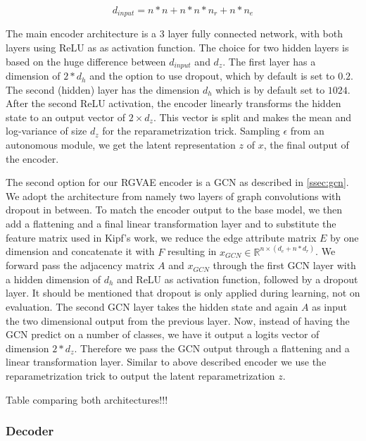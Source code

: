 \begin{equation}
\label{eq4:inputdim}
    d_{input} = n*n + n*n*n_r + n*n_e
\end{equation}

The main encoder architecture is a 3 layer fully connected network, with both layers using ReLU as as activation function. The choice for two hidden layers is based on the huge difference between $d_{input}$ and $d_z$. The first layer has a dimension of $2*d_h$ and the option to use dropout, which by default is set to $0.2$. The second (hidden) layer has the dimension $d_h$ which is by default set to $1024$. After the second ReLU activation, the encoder linearly transforms the hidden state to an output vector of $2 \times d_z$. This vector is split and makes the mean and log-variance of size $d_z$ for the reparametrization trick. Sampling $\epsilon$ from an autonomous module, we get the latent representation $z$ of $x$,  the final output of the encoder.

The second option for our RGVAE encoder is a GCN as described in \ref{ssec:gcn}. We adopt the architecture from \cite{kipf_semi-supervised_2017} namely two layers of graph convolutions with dropout in between. To match the encoder output to the base model, we then add a flattening and a final linear transformation layer and to substitute the feature matrix used in Kipf's work, we reduce the edge attribute matrix $E$ by one dimension and concatenate it with $F$ resulting in $x_{GCN} \in \mathbb{R}^{n \times (d_e+n*d_r)}$. We forward pass the adjacency matrix $A$ and $x_{GCN}$ through the first GCN layer with a hidden dimension of $d_h$ and ReLU as activation function, followed by a dropout layer. It should be mentioned that dropout is only applied during learning, not on evaluation. The second GCN layer takes the hidden state and again $A$ as input the two dimensional output from the previous layer. Now, instead of having the GCN predict on a number of classes, we have it output a logits vector of dimension $2*d_z$. Therefore we pass the GCN output through a flattening and a linear transformation layer. Similar to above described encoder we use the reparametrization trick to output the latent reparametrization $z$.  


Table comparing both architectures!!!


\subsubsection{Decoder}


